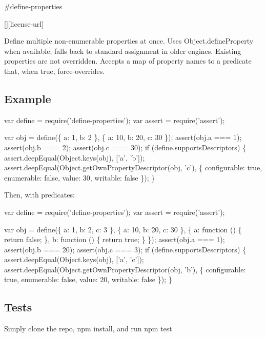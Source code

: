 \#define-\/properties \textsuperscript{\href{https://npmjs.org/package/define-properties}{\tt }}

\href{https://travis-ci.org/ljharb/define-properties}{\tt } \href{https://david-dm.org/ljharb/define-properties}{\tt } \href{https://david-dm.org/ljharb/define-properties#info=devDependencies}{\tt } \mbox{[}\mbox{]}\mbox{[}license-\/url\mbox{]} \href{http://npm-stat.com/charts.html?package=define-properties}{\tt }

\href{https://npmjs.org/package/define-properties}{\tt }

\href{https://ci.testling.com/ljharb/define-properties}{\tt }

Define multiple non-\/enumerable properties at once. Uses {\ttfamily Object.\+define\+Property} when available; falls back to standard assignment in older engines. Existing properties are not overridden. Accepts a map of property names to a predicate that, when true, force-\/overrides.

\subsection*{Example}


\begin{DoxyCode}
var define = require('define-properties');
var assert = require('assert');

var obj = define(\{ a: 1, b: 2 \}, \{
    a: 10,
    b: 20,
    c: 30
\});
assert(obj.a === 1);
assert(obj.b === 2);
assert(obj.c === 30);
if (define.supportsDescriptors) \{
    assert.deepEqual(Object.keys(obj), ['a', 'b']);
    assert.deepEqual(Object.getOwnPropertyDescriptor(obj, 'c'), \{
        configurable: true,
        enumerable: false,
        value: 30,
        writable: false
    \});
\}
\end{DoxyCode}


Then, with predicates\+: 
\begin{DoxyCode}
var define = require('define-properties');
var assert = require('assert');

var obj = define(\{ a: 1, b: 2, c: 3 \}, \{
    a: 10,
    b: 20,
    c: 30
\}, \{
    a: function () \{ return false; \},
    b: function () \{ return true; \}
\});
assert(obj.a === 1);
assert(obj.b === 20);
assert(obj.c === 3);
if (define.supportsDescriptors) \{
    assert.deepEqual(Object.keys(obj), ['a', 'c']);
    assert.deepEqual(Object.getOwnPropertyDescriptor(obj, 'b'), \{
        configurable: true,
        enumerable: false,
        value: 20,
        writable: false
    \});
\}
\end{DoxyCode}


\subsection*{Tests}

Simply clone the repo, {\ttfamily npm install}, and run {\ttfamily npm test} 